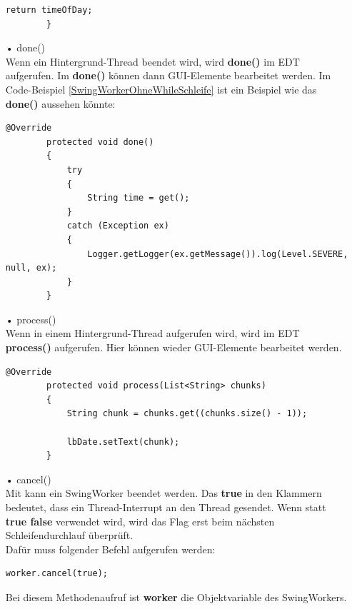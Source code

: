 \begin{itemize}
\begin{lstlisting}[style=JavaStyle, caption=SwingWorker \inlinecode{JavaStyle}{doInBackground()} ohne while Schleife, label=SwingWorkerOhneWhileSchleife]
            return timeOfDay;
        }
\end{lstlisting} 

\item[•] done()
\\ Wenn ein Hintergrund-Thread beendet wird, wird \textbf{done()} im \ac{EDT} aufgerufen. Im \textbf{done()} können dann \ac{GUI}-Elemente bearbeitet werden. Im Code-Beispiel \ref{SwingWorkerOhneWhileSchleife} ist ein Beispiel wie das \textbf{done()} aussehen könnte:
\begin{lstlisting}[style=JavaStyle, caption=SwingWorker done()]
        @Override
        protected void done()
        {	
        	try
        	{
            	String time = get();
        	}
        	catch (Exception ex)
            {
                Logger.getLogger(ex.getMessage()).log(Level.SEVERE, null, ex);
            }
        }
\end{lstlisting}
\item[•] process()
\\ Wenn in einem Hintergrund-Thread  aufgerufen wird, wird im \ac{EDT} \textbf{process()} aufgerufen. Hier können wieder \ac{GUI}-Elemente bearbeitet werden.
\begin{lstlisting}[style=JavaStyle, caption=SwingWorker process()]
        @Override
        protected void process(List<String> chunks)
        {
            String chunk = chunks.get((chunks.size() - 1));
            
            lbDate.setText(chunk);
        }
\end{lstlisting}

\newpage

\item[•] cancel()
\\ Mit  kann ein SwingWorker beendet werden. Das \textbf{true} in den Klammern bedeutet, dass ein Thread-Interrupt an den Thread gesendet. Wenn statt \textbf{true false} verwendet wird, wird das Flag erst beim nächsten Schleifendurchlauf überprüft.
\\ Dafür muss folgender Befehl aufgerufen werden:
\begin{lstlisting}[style=JavaStyle, caption=SwingWorker abbrechen]
	    worker.cancel(true);
\end{lstlisting}
Bei diesem Methodenaufruf ist \textbf{worker} die Objektvariable des SwingWorkers.
\end{itemize}

